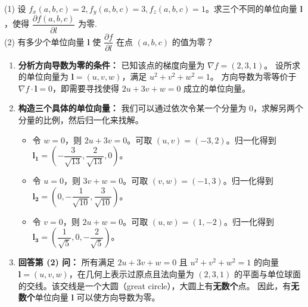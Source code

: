 \documentclass[lang=cn,11pt]{elegantbook}
\begin{document}
\begin{exercise}[方向导数为零的几何探究]
(1) 设 $f_x(a,b,c)=2, f_y(a,b,c)=3, f_z(a,b,c)=1$。求三个不同的单位向量 $\boldsymbol{l}$，使得 $\dfrac{\partial f(a,b,c)}{\partial l}$ 为零.\\
(2) 有多少个单位向量 $\boldsymbol{l}$ 使 $\dfrac{\partial f}{\partial l}$ 在点 $(a,b,c)$ 的值为零？
\end{exercise}
\begin{solution}
\begin{enumerate}
  \item \textbf{分析方向导数为零的条件：}
  已知该点的梯度向量为 $\nabla f = (2, 3, 1)$。
  设所求的单位向量为 $\boldsymbol{l} = (u, v, w)$，满足 $u^2+v^2+w^2=1$。
  方向导数为零等价于 $\nabla f \cdot \boldsymbol{l} = 0$，即需要寻找使得 $2u + 3v + w = 0$ 成立的单位向量。

  \item \textbf{构造三个具体的单位向量：}
  我们可以通过依次令某一个分量为 0，求解另两个分量的比例，然后归一化来找解。
  \begin{itemize}
    \item 令 $w=0$，则 $2u+3v=0$。可取 $(u,v) = (-3, 2)$。归一化得到 $\boldsymbol{l_1} = \left(-\dfrac{3}{\sqrt{13}}, \dfrac{2}{\sqrt{13}}, 0\right)$。
    \item 令 $u=0$，则 $3v+w=0$。可取 $(v,w) = (-1, 3)$。归一化得到 $\boldsymbol{l_2} = \left(0, -\dfrac{1}{\sqrt{10}}, \dfrac{3}{\sqrt{10}}\right)$。
    \item 令 $v=0$，则 $2u+w=0$。可取 $(u,w) = (1, -2)$。归一化得到 $\boldsymbol{l_3} = \left(\dfrac{1}{\sqrt{5}}, 0, -\dfrac{2}{\sqrt{5}}\right)$。
  \end{itemize}

  \item \textbf{回答第 (2) 问：}
  所有满足 $2u + 3v + w = 0$ 且 $u^2+v^2+w^2=1$ 的向量 $\boldsymbol{l} = (u,v,w)$，在几何上表示过原点且法向量为 $(2,3,1)$ 的平面与单位球面的交线。该交线是一个大圆（great circle），大圆上有\textbf{无数个}点。
  因此，有\textbf{无数个}单位向量 $\boldsymbol{l}$ 可以使方向导数为零。
\end{enumerate}
\end{solution}
\end{document}
